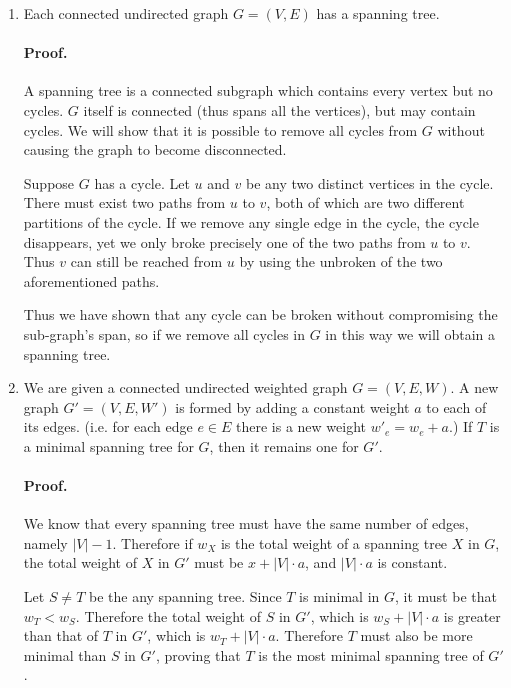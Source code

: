 \documentclass{article}
\begin{document}
\begin{enumerate}
	\item
		Each connected undirected graph \(G=(V,E)\) has a spanning tree.

		\paragraph{Proof.} A spanning tree is a connected subgraph which contains every vertex but no cycles. \(G\) itself is connected (thus spans all the vertices), but may contain cycles. We will show that it is possible to remove all cycles from \(G\) without causing the graph to become disconnected.

		Suppose \(G\) has a cycle. Let \(u\) and \(v\) be any two distinct vertices in the cycle. There must exist two paths from \(u\) to \(v\), both of which are two different partitions of the cycle. If we remove any single edge in the cycle, the cycle disappears, yet we only broke precisely one of the two paths from \(u\) to \(v\). Thus \(v\) can still be reached from \(u\) by using the unbroken of the two aforementioned paths.

		Thus we have shown that any cycle can be broken without compromising the sub-graph's span, so if we remove all cycles in \(G\) in this way we will obtain a spanning tree.

	\item
		We are given a connected undirected weighted graph \(G=(V,E,W)\). A new graph \(G' = (V, E, W')\) is formed by adding a constant weight \(a\) to each of its edges. (i.e. for each edge \(e \in E\) there is a new weight \(w'_e = w_e + a\).) If \(T\) is a minimal spanning tree for \(G\), then it remains one for \(G'\).

		\paragraph{Proof.} We know that every spanning tree must have the same number of edges, namely \(|V| - 1\). Therefore if \(w_X\) is the total weight of a spanning tree \(X\) in \(G\), the total weight of \(X\) in \(G'\) must be \(x + |V| \cdot a\), and \(|V| \cdot a\) is constant.

		Let \(S \neq T\) be the any spanning tree. Since \(T\) is minimal in \(G\), it must be that \(w_T < w_S\). Therefore the total weight of \(S\) in \(G'\), which is \(w_S + |V| \cdot a\) is greater than that of \(T\) in \(G'\), which is \(w_T + |V| \cdot a\). Therefore \(T\) must also be more minimal than \(S\) in \(G'\), proving that \(T\) is the most minimal spanning tree of \(G'\).


\end{enumerate}
\end{document}
